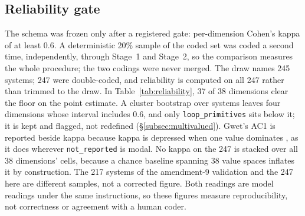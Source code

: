 \subsection{Reliability gate}\label{subsec:reliability}

The schema was frozen only after a registered gate: per-dimension Cohen's kappa of at least 0.6. A
deterministic 20\% sample of the coded set was coded a second time, independently, through Stage~1 and
Stage~2, so the comparison measures the whole procedure; the two codings were never merged. The draw
names 245 systems; 247 were double-coded, and reliability is computed on all 247 rather than trimmed to
the draw. In Table~\ref{tab:reliability}, 37 of 38 dimensions clear the floor on the point estimate. A
cluster bootstrap over systems leaves four dimensions whose interval includes 0.6, and only
\texttt{loop\_primitives} sits below it; it is kept and flagged, not redefined
(\S\ref{subsec:multivalued}). Gwet's AC1 \citep{gwet2008ac1} is
reported beside kappa because kappa is depressed when one value dominates
\citep{feinstein1990paradoxes,byrt1993kappa}, as it does wherever \texttt{not\_reported} is modal. No
kappa on the 247 is stacked over all 38 dimensions' cells, because a chance baseline spanning 38 value spaces
inflates it by construction. The 217 systems of the
amendment-9 validation and the 247 here are different samples, not a corrected figure. Both readings are
model readings under the same instructions, so these figures measure reproducibility, not correctness or
agreement with a human coder.

